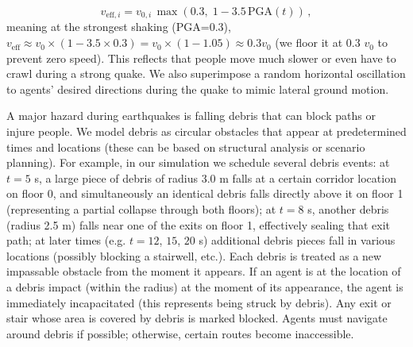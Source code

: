 \documentclass[11pt,a4paper]{article}
\begin{document}
\begin{itemize}
    \begin{equation}
       v_{\text{eff},i} = v_{0,i}\,\max(0.3,\;1 - 3.5\,\text{PGA}(t))\,,
    \end{equation}
    meaning at the strongest shaking (PGA=0.3), $v_{\text{eff}}\approx v_{0}\times(1 - 3.5\times0.3) = v_{0}\times(1 - 1.05) \approx 0.3 v_0$ (we floor it at 0.3 $v_0$ to prevent zero speed). This reflects that people move much slower or even have to crawl during a strong quake. We also superimpose a random horizontal oscillation to agents' desired directions during the quake to mimic lateral ground motion.
    
    A major hazard during earthquakes is falling debris that can block paths or injure people. We model debris as circular obstacles that appear at predetermined times and locations (these can be based on structural analysis or scenario planning). For example, in our simulation we schedule several debris events: at $t=5$ s, a large piece of debris of radius 3.0 m falls at a certain corridor location on floor 0, and simultaneously an identical debris falls directly above it on floor 1 (representing a partial collapse through both floors); at $t=8$ s, another debris (radius 2.5 m) falls near one of the exits on floor 1, effectively sealing that exit path; at later times (e.g. $t=12$, $15$, $20$ s) additional debris pieces fall in various locations (possibly blocking a stairwell, etc.). Each debris is treated as a new impassable obstacle from the moment it appears. If an agent is at the location of a debris impact (within the radius) at the moment of its appearance, the agent is immediately incapacitated (this represents being struck by debris). Any exit or stair whose area is covered by debris is marked blocked. Agents must navigate around debris if possible; otherwise, certain routes become inaccessible.
\end{itemize}
\end{document}
